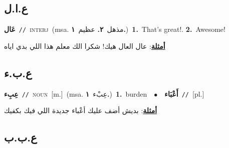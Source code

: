 \documentclass[10pt,a4paper,twoside]{article} %
\begin{document}
\begin{multicols}{2}
\vspace{-3mm}
\subsection*{\color{blue}\foreignlanguage{arabic}{ع.ا.ل}\color{blue}{ (ntws)}} 

{\setlength\topsep{0pt}\textbf{\foreignlanguage{arabic}{عَال}}\ {\color{gray}\texttt{//}\color{black}}\ \textsc{interj}\ \color{gray}(msa. \foreignlanguage{arabic}{مذهل}~\foreignlanguage{arabic}{\textbf{٢.}}  \foreignlanguage{arabic}{عظيم}~\foreignlanguage{arabic}{\textbf{١.}})\color{black}\ \textbf{1.}~That's great!.  \textbf{2.}~Awesome!\  \begin{flushright}\color{gray}\foreignlanguage{arabic}{\textbf{\underline{\foreignlanguage{arabic}{أمثلة}}}: عال العال هيك! شكرا الك معلم هذا اللي بدي اياه}\end{flushright}\color{black}} \vspace{2mm}

\vspace{-3mm}
\subsection*{\color{blue}\foreignlanguage{arabic}{ع.ب.ء}\color{blue}{}} 

{\setlength\topsep{0pt}\textbf{\foreignlanguage{arabic}{عِبِء}}\ {\color{gray}\texttt{//}\color{black}}\ \textsc{noun}\ [m.]\ \color{gray}(msa. \foreignlanguage{arabic}{عِبْء}~\foreignlanguage{arabic}{\textbf{١.}})\color{black}\ \textbf{1.}~burden\ \ $\bullet$\ \ \setlength\topsep{0pt}\textbf{\foreignlanguage{arabic}{أَعْبَاء}}\ {\color{gray}\texttt{//}\color{black}}\ [pl.]\  \begin{flushright}\color{gray}\foreignlanguage{arabic}{\textbf{\underline{\foreignlanguage{arabic}{أمثلة}}}: بديش أضف عليك أعْباء جديدة اللي فيك بكفيك}\end{flushright}\color{black}} \vspace{2mm}

\vspace{-3mm}
\subsection*{\color{blue}\foreignlanguage{arabic}{ع.ب.ب}\color{blue}{}} 


\end{multicols}
\end{document}
